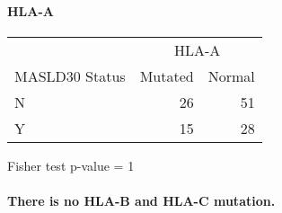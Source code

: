 \documentclass[
]{article}
\begin{document}
\hypertarget{hla-a}{%
\paragraph{HLA-A}\label{hla-a}}

\begingroup
\fontsize{12.0pt}{14.4pt}\selectfont
\setlength{\LTpost}{0mm}
\begin{longtable}{l|rr}
\toprule
 & \multicolumn{2}{c}{HLA-A} \\ 
\cmidrule(lr){2-3}
MASLD30 Status & Mutated & Normal \\ 
\midrule\addlinespace[2.5pt]
N & 26 & 51 \\ 
Y & 15 & 28 \\ 
\bottomrule
\end{longtable}
\begin{minipage}{\linewidth}
Fisher test p-value =  1\\
\end{minipage}
\endgroup

\hypertarget{there-is-no-hla-b-and-hla-c-mutation.}{%
\paragraph{There is no HLA-B and HLA-C
mutation.}\label{there-is-no-hla-b-and-hla-c-mutation.}}
\end{document}
